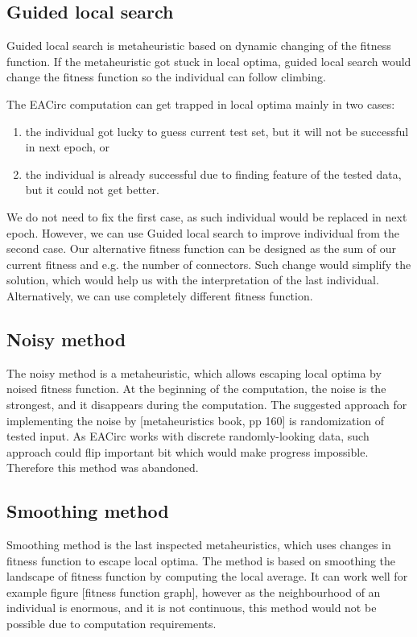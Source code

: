 \documentclass[
  print, %
  Table,   %
  nolof,     %
  nolot,     %
  draft, %
  11pt, %
  oneside  %
]{fithesis3}
\begin{document}
\subsection{Guided local search}

Guided local search is metaheuristic based on dynamic changing of the fitness function. If the metaheuristic got stuck in local optima, guided local search would change the fitness function so the individual can follow climbing.

The EACirc computation can get trapped in local optima mainly in two cases:

\begin{enumerate}
    \item the individual got lucky to guess current test set, but it will not be successful in next epoch, or
    \item the individual is already successful due to finding feature of the tested data, but it could not get better.
\end{enumerate}

We do not need to fix the first case, as such individual would be replaced in next epoch. However, we can use Guided local search to improve individual from the second case. Our alternative fitness function can be designed as the sum of our current fitness and e.g. the number of connectors. Such change would simplify the solution, which would help us with the interpretation of the last individual. Alternatively, we can use completely different fitness function.

\subsection{Noisy method}

The noisy method is a metaheuristic, which allows escaping local optima by noised fitness function. At the beginning of the computation, the noise is the strongest, and it disappears during the computation. The suggested approach for implementing the noise by [metaheuristics book, pp 160] is randomization of tested input. As EACirc works with discrete randomly-looking data, such approach could flip important bit which would make progress impossible. Therefore this method was abandoned.

\subsection{Smoothing method}

Smoothing method is the last inspected metaheuristics, which uses changes in fitness function to escape local optima. The method is based on smoothing the landscape of fitness function by computing the local average. It can work well for example figure [fitness function graph], however as the neighbourhood of an individual is enormous, and it is not continuous, this method would not be possible due to computation requirements.
\end{document}
